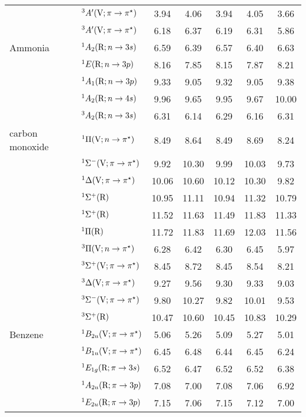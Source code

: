 \begin{tabular}{p{3.5cm}p{3.3cm}c|cccc}
        &$^3A^\prime (\mathrm{V}; \pi \rightarrow \pi^\star)$					& 3.94	&4.06	&3.94	&4.05	&3.66\\
        &$^3A^\prime (\mathrm{V}; \pi \rightarrow \pi^\star)$					& 6.18	&6.37	&6.19	&6.31	&5.86\\
  Ammonia		&$^1A_2 (\mathrm{R};n \rightarrow 3s)$ 					&6.59	&6.39	&6.57	&6.40	&6.63	 \\
        &$^1E (\mathrm{R};n \rightarrow 3p)$ 					&8.16	&7.85	&8.15	&7.87	&8.21 	\\
        &$^1A_1 (\mathrm{R};n \rightarrow 3p)$ 					&9.33	&9.05	&9.32	&9.05	&9.38 	\\
        &$^1A_2 (\mathrm{R};n \rightarrow 4s)$ 					&9.96	&9.65	&9.95	&9.67	&10.00	 \\
        &$^3A_2 (\mathrm{R};n \rightarrow 3s)$ 					&6.31	&6.14	&6.29	&6.16	&6.31 	\\
  carbon monoxide	&$^1\Pi (\mathrm{V};n \rightarrow \pi^\star)$ 				& 8.49	&8.64	&8.49	&8.69	&8.24	 \\
        &$^1\Sigma^- (\mathrm{V};\pi \rightarrow \pi^\star)$				& 9.92	&10.30	&9.99	&10.03	&9.73	\\
        &$^1\Delta (\mathrm{V};\pi \rightarrow \pi^\star)$ 				&10.06	&10.60	&10.12	&10.30	&9.82	\\
        &$^1\Sigma^+ (\mathrm{R})$ 					&10.95	&11.11	&10.94	&11.32	&10.79	\\
        &$^1\Sigma^+ (\mathrm{R})$ 					&11.52	&11.63	&11.49	&11.83	&11.33	\\
        &$^1\Pi (\mathrm{R})$							&11.72	&11.83	&11.69	&12.03	&11.56	\\
        &$^3\Pi (\mathrm{V};n \rightarrow \pi^\star)$ 					& 6.28	&6.42	&6.30	&6.45	&5.97	\\
        &$^3\Sigma^+ (\mathrm{V};\pi \rightarrow \pi^\star)$			& 8.45	&8.72	&8.45	&8.54	&8.21	\\
        &$^3\Delta (\mathrm{V};\pi \rightarrow \pi^\star)$ 				& 9.27	&9.56	&9.30	&9.33	&9.03	\\
        &$^3\Sigma^- (\mathrm{V};\pi \rightarrow \pi^\star)$				& 9.80	&10.27	&9.82	&10.01	&9.53	\\
        &$^3\Sigma^+ (\mathrm{R})$ 					& 10.47	&10.60	&10.45	&10.83	&10.29	\\
  Benzene		&$^1B_{2u} (\mathrm{V}; \pi \rightarrow \pi^\star)$				& 5.06	&5.26	&5.09	&5.27	&5.01\\
        &$^1B_{1u} (\mathrm{V}; \pi \rightarrow \pi^\star)$				& 6.45	&6.48	&6.44	&6.45	&6.24\\
        &$^1E_{1g} (\mathrm{R}; \pi \rightarrow 3s)$				& 6.52	&6.47	&6.52	&6.52	&6.38\\
        &$^1A_{2u}  (\mathrm{R}; \pi \rightarrow 3p)$				& 7.08	&7.00	&7.08	&7.06	&6.92\\
        &$^1E_{2u}  (\mathrm{R}; \pi \rightarrow 3p)$				& 7.15	&7.06	&7.15	&7.12	&7.00\\

\end{tabular}
